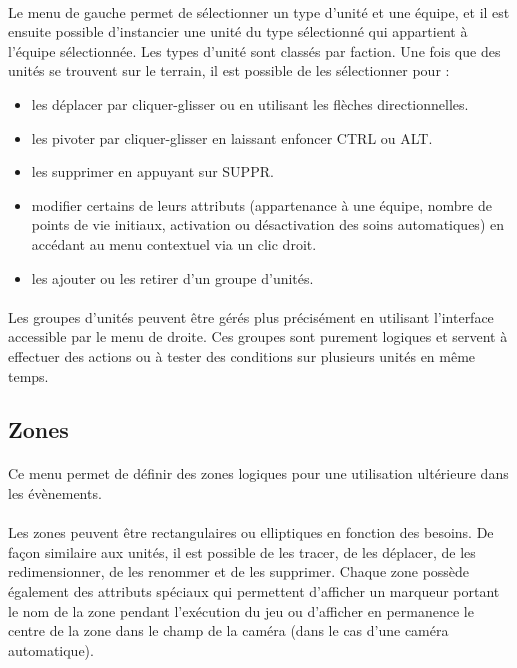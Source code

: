 \documentclass[a4paper]{article}
\begin{document}
\paragraph{ }
Le menu de gauche permet de sélectionner un type d'unité et une équipe, et il est ensuite possible d'instancier une unité du type sélectionné qui appartient à l'équipe sélectionnée. Les types d'unité sont classés par faction. Une fois que des unités se trouvent sur le terrain, il est possible de les sélectionner pour :
\begin{itemize}
\item les déplacer par cliquer-glisser ou en utilisant les flèches directionnelles.
\item les pivoter par cliquer-glisser en laissant enfoncer CTRL ou ALT. 
\item les supprimer en appuyant sur SUPPR.
\item modifier certains de leurs attributs (appartenance à une équipe, nombre de points de vie initiaux, activation ou désactivation des soins automatiques) en accédant au menu contextuel via un clic droit.
\item les ajouter ou les retirer d'un groupe d'unités.
\end{itemize}
\paragraph{ }
Les groupes d'unités peuvent être gérés plus précisément en utilisant l'interface accessible par le menu de droite. Ces groupes sont purement logiques et servent à effectuer des actions ou à tester des conditions sur plusieurs unités en même temps.
\subsection{Zones}
\paragraph{ }
Ce menu permet de définir des zones logiques pour une utilisation ultérieure dans les évènements.
\paragraph{ }
Les zones peuvent être rectangulaires ou elliptiques en fonction des besoins. De façon similaire aux unités, il est possible de les tracer, de les déplacer, de les redimensionner, de les renommer et de les supprimer. Chaque zone possède également des attributs spéciaux qui permettent d'afficher un marqueur portant le nom de la zone pendant l'exécution du jeu ou d'afficher en permanence le centre de la zone dans le champ de la caméra (dans le cas d'une caméra automatique).
\end{document}
